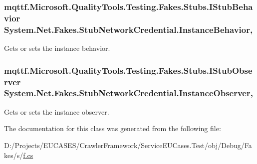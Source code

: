 \hypertarget{class_system_1_1_net_1_1_fakes_1_1_stub_network_credential_a0903c3f2fdecd22731af96c0e08f3aec}{
\subsubsection[{Instance\-Behavior}]{\setlength{\rightskip}{0pt plus 5cm}mqttf.\-Microsoft.\-Quality\-Tools.\-Testing.\-Fakes.\-Stubs.\-I\-Stub\-Behavior System.\-Net.\-Fakes.\-Stub\-Network\-Credential.\-Instance\-Behavior\hspace{0.3cm}{\ttfamily [get]}, {\ttfamily [set]}}}\label{class_system_1_1_net_1_1_fakes_1_1_stub_network_credential_a0903c3f2fdecd22731af96c0e08f3aec}


Gets or sets the instance behavior.

\hypertarget{class_system_1_1_net_1_1_fakes_1_1_stub_network_credential_aab3c0a9382659e209838692837700125}{
\subsubsection[{Instance\-Observer}]{\setlength{\rightskip}{0pt plus 5cm}mqttf.\-Microsoft.\-Quality\-Tools.\-Testing.\-Fakes.\-Stubs.\-I\-Stub\-Observer System.\-Net.\-Fakes.\-Stub\-Network\-Credential.\-Instance\-Observer\hspace{0.3cm}{\ttfamily [get]}, {\ttfamily [set]}}}\label{class_system_1_1_net_1_1_fakes_1_1_stub_network_credential_aab3c0a9382659e209838692837700125}


Gets or sets the instance observer.



The documentation for this class was generated from the following file\-:\begin{DoxyCompactItemize}
\item 
D\-:/\-Projects/\-E\-U\-C\-A\-S\-E\-S/\-Crawler\-Framework/\-Service\-E\-U\-Cases.\-Test/obj/\-Debug/\-Fakes/s/\hyperlink{s_2f_8cs}{f.\-cs}\end{DoxyCompactItemize}
